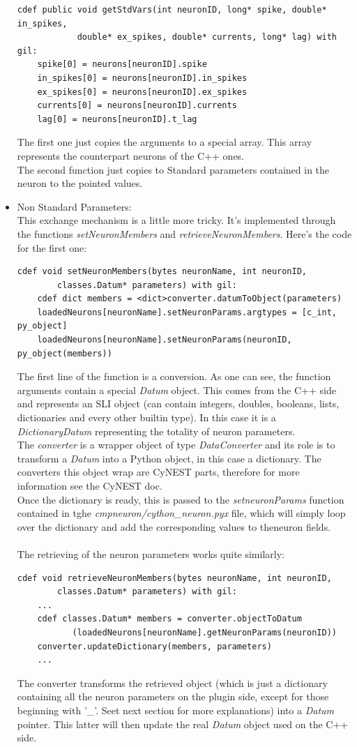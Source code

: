 \documentclass{article}
\begin{document}
\begin{itemize}
\begin{verbatim}
cdef public void getStdVars(int neuronID, long* spike, double* in_spikes, 
            double* ex_spikes, double* currents, long* lag) with gil:
    spike[0] = neurons[neuronID].spike
    in_spikes[0] = neurons[neuronID].in_spikes
    ex_spikes[0] = neurons[neuronID].ex_spikes
    currents[0] = neurons[neuronID].currents
    lag[0] = neurons[neuronID].t_lag
\end{verbatim}
The first one just copies the arguments to a special array. This array represents the counterpart neurons of the C++ ones.\\
The second function just copies to Standard parameters contained in the neuron to the pointed values.
\item Non Standard Parameters:\\
This exchange mechanism is a little more tricky. It's implemented through the functions \emph{setNeuronMembers} and \emph{retrieveNeuronMembers}. Here's the code for the first one:
\begin{verbatim}
cdef void setNeuronMembers(bytes neuronName, int neuronID, 
        classes.Datum* parameters) with gil:
    cdef dict members = <dict>converter.datumToObject(parameters)
    loadedNeurons[neuronName].setNeuronParams.argtypes = [c_int, py_object]
    loadedNeurons[neuronName].setNeuronParams(neuronID, py_object(members))
\end{verbatim}
The first line of the function is a conversion. As one can see, the function arguments contain a special \emph{Datum} object. This comes from the C++ side and represents an SLI object (can contain integers, doubles, booleans, lists, dictionaries and every other builtin type). In this case it is a \emph{DictionaryDatum} representing the totality of neuron parameters.\\
The \emph{converter} is a wrapper object of type \emph{DataConverter} and its role is to transform a \emph{Datum} into a Python object, in this case a dictionary. The converters this object wrap are CyNEST parts, therefore for more information see the CyNEST doc.\\
Once the dictionary is ready, this is passed to the \emph{setneuronParams} function contained in tghe \emph{cmpneuron/cython\_neuron.pyx} file, which will simply loop over the dictionary and add the corresponding values to theneuron fields.\\ \\


The retrieving of the neuron parameters works quite similarly:
\begin{verbatim}
cdef void retrieveNeuronMembers(bytes neuronName, int neuronID, 
        classes.Datum* parameters) with gil:
    ...
    cdef classes.Datum* members = converter.objectToDatum
           (loadedNeurons[neuronName].getNeuronParams(neuronID))
    converter.updateDictionary(members, parameters)
    ...
\end{verbatim}
The converter transforms the retrieved object (which is just a dictionary containing all the neuron parameters on the plugin side, except for those beginning with '\_'. Seet next section for more explanations) into a \emph{Datum} pointer. This latter will then update the real \emph{Datum} object used on the C++ side.
\end{itemize}
\end{document}
